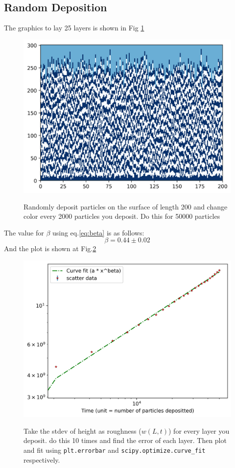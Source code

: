 \documentclass[12pt]{article}
\begin{document}
	\subsection{Random Deposition}
	The graphics to lay 25 layers is shown in Fig \ref{fig:RD25}
	\begin{figure}[h!]
		\includegraphics[width=\linewidth]{../P4/canvas.jpg}
		\label{fig:RD25}
		\caption{Randomly deposit particles on the surface of length 200 and change  color every 2000 particles you deposit. Do this for 50000 particles}
	\end{figure}
	The value for $\beta$ using eq.\ref{eq:beta} is as follows:
	\begin{equation*}
		\beta = 0.44 \pm 0.02
	\end{equation*}
	And the plot is shown at Fig.\ref{fig:RD25beta}
	\begin{figure}[h!]
		\includegraphics[width=\linewidth]{../P4/plot_for_beta.jpg}
		\label{fig:RD25beta}
		\caption{Take the stdev of height as roughness ($w(L, t)$) for every layer you deposit.
		do this 10 times and find the error of each layer. Then plot and fit using 
		\texttt{plt.errorbar} and \texttt{scipy.optimize.curve\_fit} respectively.}
	\end{figure}
\end{document}
